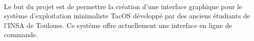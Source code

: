 \paragraph{}

Le but du projet est de permettre la création d'une interface graphique pour le système d'exploitation minimaliste TacOS développé par des anciens étudiants de l'INSA de Toulouse. Ce système offre actuellement une interface en ligne de commande.